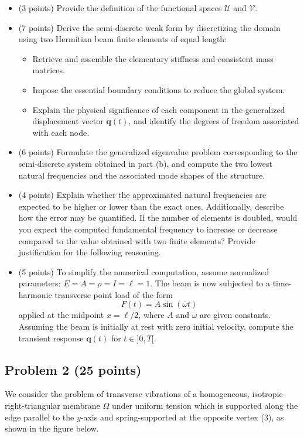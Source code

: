 \documentclass[12pt]{article}
\begin{document}
\begin{itemize}
	\item[(a)] (3 points)  Provide the definition of the functional spaces \( \mathcal{U} \) and \( \mathcal{V} \).
	\item[(b)] (7 points) Derive the semi-discrete weak form by discretizing the domain using two Hermitian beam finite elements of equal length:
	      \begin{itemize}
		      \item Retrieve and assemble the elementary stiffness and consistent mass matrices.
		      \item Impose the essential boundary conditions to reduce the global system.
		      \item Explain the physical significance of each component in the generalized displacement vector \( \mathbf{q}(t) \), and identify the degrees of freedom associated with each node.
	      \end{itemize}
	\item[(c)] (6 points)  Formulate the generalized eigenvalue problem corresponding to the semi-discrete system obtained in part (b), and compute the two lowest natural frequencies and the associated mode shapes of the structure.
	\item[(d)] (4 points)  Explain whether the approximated natural frequencies are expected to be higher or lower than the exact ones.  Additionally, describe how the error may be quantified. If the number of elements is doubled, would you expect the computed fundamental frequency to increase or decrease compared to the value obtained with two finite elements? Provide justification for the following reasoning.

	\item[(e)] (5 points) To simplify the numerical computation, assume normalized parameters: \( E = A = \rho = I = \ell = 1 \). The beam is now subjected to a time-harmonic transverse point load of the form
	      \[
		      F(t) = A \sin(\bar\omega t)
	      \]
	      applied at the midpoint \( x = \ell/2 \), where \( A \) and \( \bar\omega \) are given constants. Assuming the beam is initially at rest with zero initial velocity, compute the transient response \( \mathbf{q}(t) \) for \( t\in]0,T[ \).
\end{itemize}

\subsection*{Problem 2 {\small (25 points)}}
We consider the problem of transverse vibrations of a homogeneous, isotropic  right-triangular membrane $\Omega$ under uniform tension which is supported along the edge parallel to the $y$-axis and spring-supported at the opposite vertex (3), as shown in the figure below.
\end{document}
